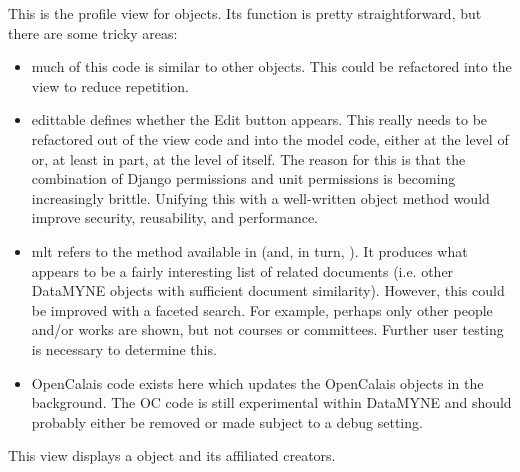 \documentclass[letterpaper,10pt,english]{sphinxmanual}
\begin{document}
\begin{fulllineitems}
\label{generated/apps.profiles.views:apps.profiles.views.view_student_profile}
This is the profile view for  objects.  Its function is pretty
straightforward, but there are some tricky areas:
\begin{itemize}
\item {} 
much of this code is similar to other  objects.  This could be
refactored into the  view to reduce repetition.

\item {} 
edittable defines whether the Edit button appears.  This really needs
to be refactored out of the view code and into the model code, either
at the level of  or, at least in part, at the level of
 itself.  The reason for this is that the combination of 
Django permissions and unit permissions is becoming increasingly brittle.
Unifying this with a well-written object method would improve security,
reusability, and performance.

\item {} 
mlt refers to the  method available in  
(and, in turn, ).  It produces what appears to be a fairly interesting
list of related documents (i.e. other DataMYNE objects with sufficient
document similarity).  However, this could be improved with a faceted search.
For example, perhaps only other people and/or works are shown, but not courses
or committees.  Further user testing is necessary to determine this.

\item {} 
OpenCalais code exists here which updates the OpenCalais objects in
the background.  The OC code is still experimental within DataMYNE and
should probably either be removed or made subject to a debug setting.

\end{itemize}

\end{fulllineitems}



\begin{fulllineitems}
\label{generated/apps.profiles.views:apps.profiles.views.view_work}
This view displays a  object and its affiliated creators.

\end{fulllineitems}
\end{document}
